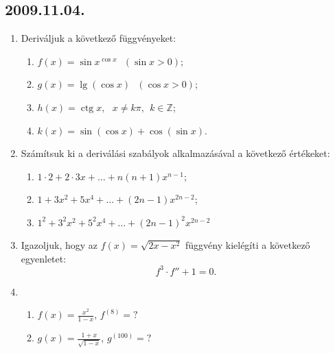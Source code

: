 \documentclass{article}
\newenvironment{abc}{\begin{enumerate}[label=\textit{\alph*})]}{\end{enumerate}}
\newcommand{\ctg}{\mathop{\mathrm{ctg}}\nolimits}
\begin{document}
\subsection*{2009.11.04.}
\begin{enumerate}
\item Deriváljuk a következő függvényeket:
	\begin{abc}
	\item $f(x)=\sin x^{\cos x}~~~(\sin x>0)$;
	\item $g(x)=\lg(\cos x) ~~~ (\cos x>0)$;
	\item $h(x)=\ctg x,~~~x\neq k\pi,~~k\in \mathbb{Z}$;
	\item $k(x)=\sin(\cos x)+ \cos (\sin x)$.
	\end{abc}
\item Számítsuk ki a deriválási szabályok alkalmazásával a következő értékeket:
	\begin{abc}
	\item $1\cdot 2+ 2\cdot 3x+\ldots +n(n+1)x^{n-1}$;
	\item $1+ 3x^2+ 5x^4+\ldots +(2n-1)x^{2n-2}$;
	\item $1^2+ 3^2x^2+ 5^2x^4+\ldots +(2n-1)^2x^{2n-2}$
	\end{abc}
\item Igazoljuk, hogy az $f(x)=\sqrt{2x-x^2}$ függvény kielégíti a következő egyenletet: 
	\[f^3 \cdot f'' +1=0 .\]
\item
	\begin{abc}
	\item $f(x)=\frac{x^2}{1-x}$, $f^{(8)}=?$
	\item $g(x)=\frac{1+x}{\sqrt{1-x}}$, $g^{(100)}=?$
	\end{abc}
\end{enumerate}
\end{document}
